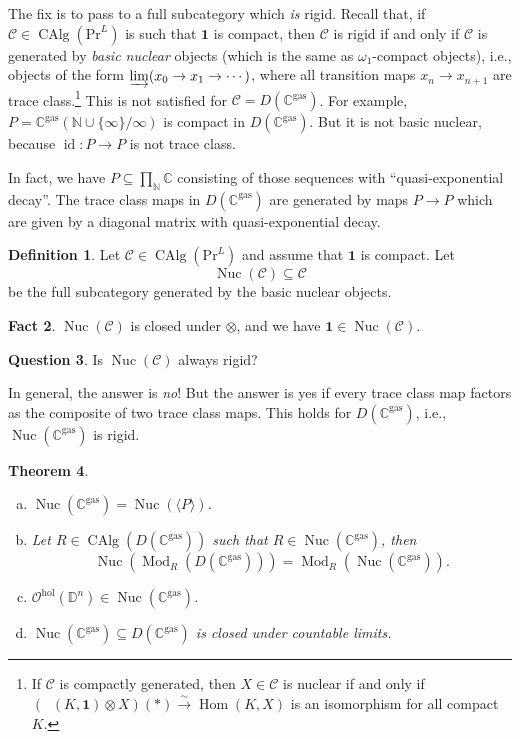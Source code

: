 \documentclass[draft]{amsart}
\newcommand{\NN}{\mathbb{N}}
\newcommand{\DD}{\mathbb{D}}
\newcommand{\CC}{\mathbb{C}}
\renewcommand{\O}{\mathcal{O}}
\newcommand{\ul}[1]{\underline{#1}}
\newcommand{\cat}[1]{\mathcal{#1}}
\newcommand{\isoto}{\mathbin{\xrightarrow{\sim}}}
\renewcommand{\Pr}{\mathrm{Pr}}
\newcommand{\one}{\mathbf{1}}
\DeclareMathOperator{\Hom}{Hom}
\DeclareMathOperator{\id}{id}
\DeclareMathOperator{\CAlg}{CAlg}
\DeclareMathOperator{\iHom}{\ul{Hom}}
\DeclareMathOperator{\Nuc}{Nuc}
\DeclareMathOperator{\Mod}{Mod}
\newtheorem{thm}{Theorem}[section]
\theoremstyle{definition}
\newtheorem{defn}[thm]{Definition}
\newtheorem{question}[thm]{Question}
\newtheorem{fact}[thm]{Fact}
\begin{document}
The fix is to pass to a full subcategory which \emph{is} rigid. Recall that, if $\cat C\in \CAlg(\Pr^L)$ is such that $\one$ is compact, then $\cat C$ is rigid if and only if $\cat C$ is generated by \emph{basic nuclear} objects (which is the same as $\omega_1$-compact objects), i.e., objects of the form $\varinjlim (x_0\to x_1\to \dotsb)$, where all transition maps $x_n\to x_{n+1}$ are trace class.\footnote{If $\cat C$ is compactly generated, then $X\in \cat C$ is nuclear if and only if $(\iHom(K,\one)\otimes X)(*)\isoto \Hom(K,X)$ is an isomorphism for all compact $K$.} This is not satisfied for $\cat C = D(\CC^{\mathrm{gas}})$. For example, $P = \CC^{\mathrm{gas}}(\NN\cup\{\infty\}/\infty)$ is compact in $D(\CC^{\mathrm{gas}})$. But it is not basic nuclear, because $\id\colon P\to P$ is not trace class.

In fact, we have $P\subseteq \prod_{\NN} \CC$ consisting of those sequences with \enquote{quasi-exponential decay}. The trace class maps in $D(\CC^{\mathrm{gas}})$ are generated by maps $P\to P$ which are given by a diagonal matrix with quasi-exponential decay.

\begin{defn}
Let $\cat C \in \CAlg(\Pr^L)$ and assume that $\one$ is compact. Let
\[
\Nuc(\cat C) \subseteq \cat C
\]
be the full subcategory generated by the basic nuclear objects.
\end{defn}

\begin{fact}
$\Nuc(\cat C)$ is closed under $\otimes$, and we have $\one\in \Nuc(\cat C)$.
\end{fact}

\begin{question}
Is $\Nuc(\cat C)$ always rigid?
\end{question}

In general, the answer is \emph{no}! But the answer is yes if every trace class map factors as the composite of two trace class maps. This holds for $D(\CC^{\mathrm{gas}})$, i.e., $\Nuc(\CC^{\mathrm{gas}})$ is rigid.

\begin{thm}
\begin{enumerate}[(a)]
\item $\Nuc(\CC^{\mathrm{gas}}) = \Nuc(\langle P\rangle)$.
\item Let $R\in \CAlg(D(\CC^{\mathrm{gas}}))$ such that $R\in \Nuc(\CC^{\mathrm{gas}})$, then
\[
\Nuc(\Mod_R(D(\CC^{\mathrm{gas}}))) = \Mod_R(\Nuc(\CC^{\mathrm{gas}})).
\]

\item $\O^{\mathrm{hol}}(\DD^n) \in \Nuc(\CC^{\mathrm{gas}})$.
\item $\Nuc(\CC^{\mathrm{gas}}) \subseteq D(\CC^{\mathrm{gas}})$ is closed under countable limits.
\end{enumerate}
\end{thm}
\end{document}
